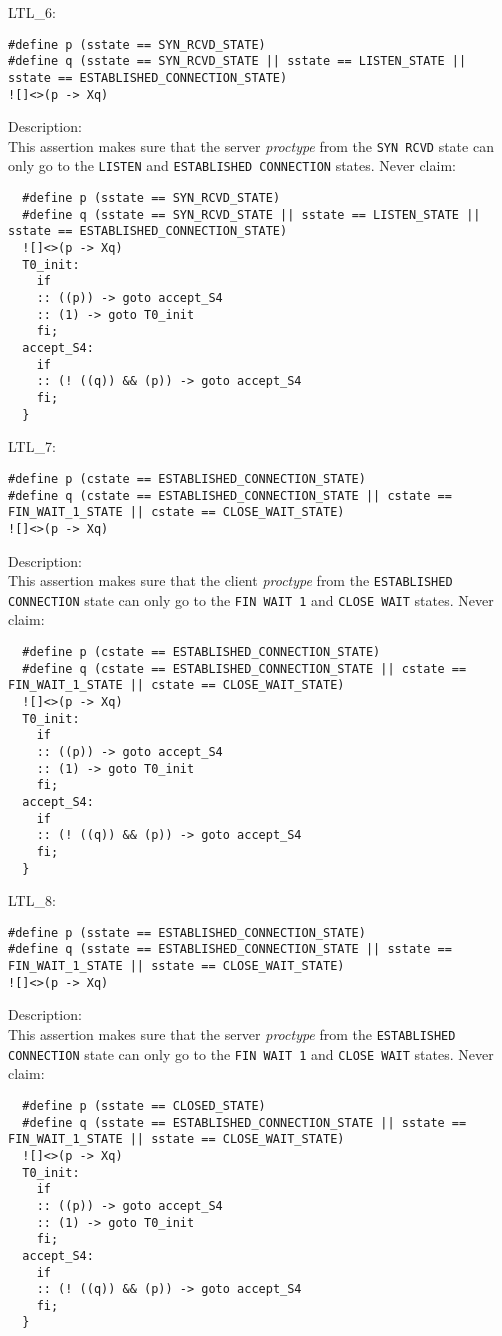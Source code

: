 \documentclass{WigReport}
\begin{document}
LTL\_6:\\
\begin{lstlisting}
#define p (sstate == SYN_RCVD_STATE)
#define q (sstate == SYN_RCVD_STATE || sstate == LISTEN_STATE || sstate == ESTABLISHED_CONNECTION_STATE)
![]<>(p -> Xq)
\end{lstlisting}
Description:\\
This assertion makes sure that the server \textit{proctype} from the \verb|SYN RCVD| state can only go to the \verb|LISTEN| and \verb|ESTABLISHED CONNECTION| states.
Never claim:\\
\begin{lstlisting}
  #define p (sstate == SYN_RCVD_STATE)
  #define q (sstate == SYN_RCVD_STATE || sstate == LISTEN_STATE || sstate == ESTABLISHED_CONNECTION_STATE)
  ![]<>(p -> Xq)
  T0_init:
    if
    :: ((p)) -> goto accept_S4
    :: (1) -> goto T0_init
    fi;
  accept_S4:
    if
    :: (! ((q)) && (p)) -> goto accept_S4
    fi;
  }
\end{lstlisting}


LTL\_7:\\
\begin{lstlisting}
#define p (cstate == ESTABLISHED_CONNECTION_STATE)
#define q (cstate == ESTABLISHED_CONNECTION_STATE || cstate == FIN_WAIT_1_STATE || cstate == CLOSE_WAIT_STATE)
![]<>(p -> Xq)
\end{lstlisting}
Description:\\
This assertion makes sure that the client \textit{proctype} from the \verb|ESTABLISHED CONNECTION| state can only go to the \verb|FIN WAIT 1| and \verb|CLOSE WAIT| states.
Never claim:\\
\begin{lstlisting}
  #define p (cstate == ESTABLISHED_CONNECTION_STATE)
  #define q (cstate == ESTABLISHED_CONNECTION_STATE || cstate == FIN_WAIT_1_STATE || cstate == CLOSE_WAIT_STATE)
  ![]<>(p -> Xq)
  T0_init:
    if
    :: ((p)) -> goto accept_S4
    :: (1) -> goto T0_init
    fi;
  accept_S4:
    if
    :: (! ((q)) && (p)) -> goto accept_S4
    fi;
  }
\end{lstlisting}


LTL\_8:\\
\begin{lstlisting}
#define p (sstate == ESTABLISHED_CONNECTION_STATE)
#define q (sstate == ESTABLISHED_CONNECTION_STATE || sstate == FIN_WAIT_1_STATE || sstate == CLOSE_WAIT_STATE)
![]<>(p -> Xq)
\end{lstlisting}
Description:\\
This assertion makes sure that the server \textit{proctype} from the \verb|ESTABLISHED CONNECTION| state can only go to the \verb|FIN WAIT 1| and \verb|CLOSE WAIT| states.
Never claim:\\
\begin{lstlisting}
  #define p (sstate == CLOSED_STATE)
  #define q (sstate == ESTABLISHED_CONNECTION_STATE || sstate == FIN_WAIT_1_STATE || sstate == CLOSE_WAIT_STATE)
  ![]<>(p -> Xq)
  T0_init:
    if
    :: ((p)) -> goto accept_S4
    :: (1) -> goto T0_init
    fi;
  accept_S4:
    if
    :: (! ((q)) && (p)) -> goto accept_S4
    fi;
  }
\end{lstlisting}
\end{document}
